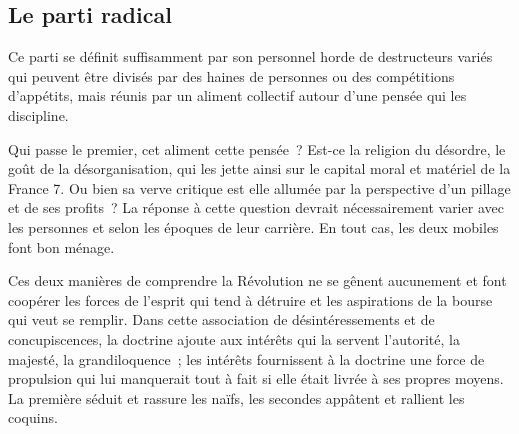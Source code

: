 \documentclass[french,twoside]{book} %
\newcommand{\astermono}{\medskip\centerline{\color{rubric}\large\selectfont{\syms ✻}}\medskip\par}%
\begin{document}
\astermono

\subsection[Le parti radical]{Le parti radical}
\noindent Ce parti se définit suffisamment par son personnel horde de destructeurs variés qui peuvent être divisés par des haines de personnes ou des compétitions d’appétits, mais réunis par un aliment collectif autour d’une pensée qui les discipline.\par
Qui passe le premier, cet aliment cette pensée ? Est-ce la religion du désordre, le goût de la désorganisation, qui les jette ainsi sur le capital moral et matériel de la France 7. Ou bien sa verve critique est elle allumée par la perspective d’un pillage et de ses profits ? La réponse à cette question devrait nécessairement varier avec les personnes et selon les époques de leur carrière. En tout cas, les deux mobiles font bon ménage.\par
Ces deux manières de comprendre la Révolution ne se gênent aucunement et font coopérer les forces de l’esprit qui tend à détruire et les aspirations de la bourse qui veut se remplir. Dans cette association de désintéressements et de concupiscences, la doctrine ajoute aux intérêts qui la servent l’autorité, la majesté, la grandiloquence ; les intérêts fournissent à la doctrine une force de propulsion qui lui manquerait tout à fait si elle était livrée à ses propres moyens. La première séduit et rassure les naïfs, les secondes appâtent et rallient les coquins.\par

\astermono
\end{document}
